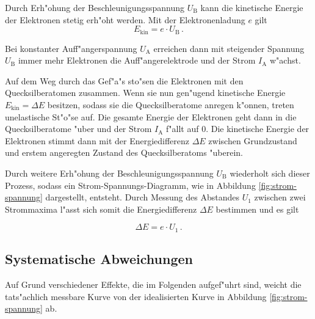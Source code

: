 	Durch Erh"ohung der Beschleunigungsspannung $U_\mathrm{B}$ kann die kinetische Energie der Elektronen stetig erh"oht werden. Mit der Elektronenladung $e$ gilt
	\begin{equation}
		E_\mathrm{kin} = e \cdot U_\mathrm{B} \,.
	\end{equation}

	Bei konstanter Auff"angerspannung $U_\mathrm{A}$ erreichen dann mit steigender Spannung $U_\mathrm{B}$ immer mehr Elektronen die Auff"angerelektrode und der Strom $I_\mathrm{A}$ w"achst.

	Auf dem Weg durch das Gef"a"s sto"sen die Elektronen mit den Quecksilberatomen zusammen.
	Wenn sie nun gen"ugend kinetische Energie $E_\mathrm{kin} = \Delta E$ besitzen, sodass sie die Quecksilberatome anregen k"onnen, treten unelastische St"o"se auf.
	Die gesamte Energie der Elektronen geht dann in die Quecksilberatome "uber und der Strom $I_\mathrm{A}$ f"allt auf 0.
	Die kinetische Energie der Elektronen stimmt dann mit der Energiedifferenz $\Delta E$ zwischen Grundzustand und erstem angeregten Zustand des Quecksilberatoms "uberein.

	Durch weitere Erh"ohung der Beschleunigungsspannung $U_\mathrm{B}$ wiederholt sich dieser Prozess, sodass ein Strom-Spannungs-Diagramm, wie in Abbildung \ref{fig:strom-spannung} dargestellt, entsteht.
	Durch Messung des Abstandes $U_1$ zwischen zwei Strommaxima l"asst sich somit die Energiedifferenz $\Delta E$ bestimmen und es gilt

	\begin{equation}
		\Delta E = e \cdot U_1 \,. \label{eqn:anregung}
	\end{equation}

	\subsection{Systematische Abweichungen}
	\label{subsec:abweichungen}
		Auf Grund verschiedener Effekte, die im Folgenden aufgef"uhrt sind, weicht die tats"achlich messbare Kurve von der idealisierten Kurve in Abbildung \ref{fig:strom-spannung} ab.

